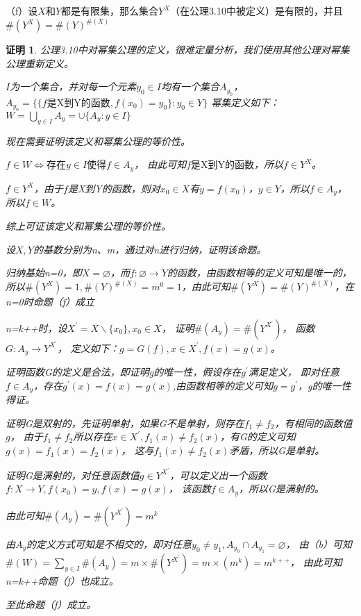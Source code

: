 \documentclass{article}
\theoremstyle{mystyle}
\theoremstyle{zproofstyle}
\newtheorem*{zproof}{证明}
\begin{document}
（f）设$X$和$Y$都是有限集，那么集合$Y^X$（在公理3.10中被定义）是有限的，并且$\#(Y^X)=\#(Y)^{\#(X)}$
\begin{zproof}
  公理3.10中对幂集公理的定义，很难定量分析，我们使用其他公理对幂集公理重新定义。


  $I$为一个集合，并对每一个元素$y_0 \in I$均有一个集合$A_{y_0}$，
  $A_{y_0} = \{ \{f\text{是X到Y的函数}, f(x_0)=y_0\}: y_0 \in Y\}$
  幂集定义如下：
  $W=\bigcup\limits_{y \in I}A_{y} = \cup\{A_y : y \in I\}$

  现在需要证明该定义和幂集公理的等价性。

  $f \in W \Leftrightarrow \text{存在} y \in I \text{使得} f \in A_y$，
  由此可知$f\text{是X到Y的函数}$，所以$f \in Y^X$。

  $f \in Y^X$，由于$f$是X到Y的函数，则对$x_0 \in X$有$y=f(x_0)$，$y \in Y$，所以$f \in A_y$，
  所以$f \in W$。

  综上可证该定义和幂集公理的等价性。


  设$X,Y$的基数分别为n、m，通过对n进行归纳，证明该命题。

  归纳基始n=0，即$X = \varnothing$，而$f: \varnothing \rightarrow Y$的函数，由函数相等的定义可知是唯一的，
  所以$\#(Y^X)=1,\#(Y)^{\#(X)}=m^0=1$，由此可知$\#(Y^X)=\#(Y)^{\#(X)}$，在n=0时命题（f）成立

  n=k++时，设$X^\prime=X \backslash \{x_0\}, x_0 \in X$，
  证明$\#(A_y)=\#(Y^{X^\prime})$，
  函数$G: A_y \rightarrow Y^{X^\prime}$，
  定义如下：$ g=G(f), x \in X^\prime, f(x)=g(x)$。

  证明函数G的定义是合法，即证明g的唯一性，假设存在$g^\prime$满足定义，
  即对任意$f \in A_y$，存在$g^\prime(x)=f(x)=g(x)$,由函数相等的定义可知$g=g^\prime$，g的唯一性得证。

  证明G是双射的，先证明单射，如果G不是单射，则存在$f_1 \neq f_2$，有相同的函数值$g$，
  由于$f_1 \neq f_2$所以存在$x \in X^\prime, f_1(x) \neq f_2(x)$，有G的定义可知$g(x)=f_1(x)=f_2(x)$，
  这与$f_1(x) \neq f_2(x)$矛盾，所以G是单射。

  证明G是满射的，对任意函数值$g \in Y^{X^\prime}$，可以定义出一个函数$f: X \rightarrow Y, f(x_0)=y, f(x)=g(x)$，
  该函数$f \in A_y$，所以G是满射的。

  由此可知$\#(A_y)=\#(Y^{X^\prime})=m^k$

  由$A_y$的定义方式可知是不相交的，即对任意$y_0 \neq y_1, A_{y_0} \cap A_{y_1}=\varnothing$，
  由（b）可知$\#(W)=\sum_{y \in I} \#(A_y) = m \times \#(Y^{X^\prime}) = m \times (m^k) = m^{k++} $，
  由此可知n=k++命题（f）也成立。

  至此命题（f）成立。
\end{zproof}
\end{document}
